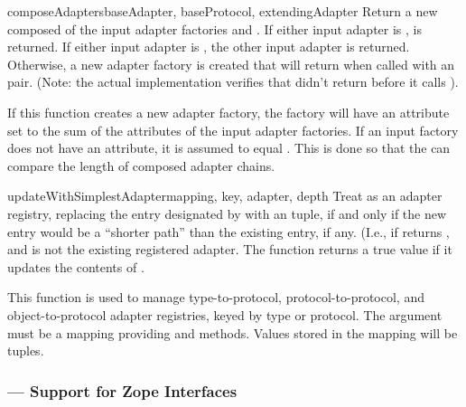 \begin{verbatim%
}
\begin{verbatim%
}
\begin{verbatim%
}
\begin{verbatim%
}
\begin{verbatim%
}
\begin{verbatim%
}
\begin{funcdesc}{composeAdapters}{baseAdapter, baseProtocol, extendingAdapter}
Return a new  composed of the input adapter factories
 and .  If either input adapter is
,  is returned.  If
either input adapter is , the other input adapter
is returned.  Otherwise, a new adapter factory is created that will return
when called with an  pair.  (Note: the actual
implementation verifies that  didn't return 
before it calls ).

If this function creates a new adapter factory, the factory will have an
 attribute set to the sum of the
 attributes of the input adapter factories.  If an
input factory does not have an  attribute, it is
assumed to equal .  This is done so that the
 can compare the length of composed adapter chains.
\end{funcdesc}


\begin{funcdesc}{updateWithSimplestAdapter}{mapping, key, adapter, depth}
Treat  as an adapter registry, replacing the entry designated by
 with an  tuple, if and only if
the new entry would be a ``shorter path'' than the existing entry, if any.
(I.e., if 
returns , and  is not the existing registered
adapter.  The function returns a true value if it updates the contents of
.

This function is used to manage type-to-protocol, protocol-to-protocol, and
object-to-protocol adapter registries, keyed by type or protocol.  The
 argument must be a mapping providing 
and  methods.  Values stored in the mapping will be
 tuples.
\end{funcdesc}





\newpage
\subsubsection{ --- Support for Zope Interfaces}


\end{verbatim%
}
\end{verbatim%
}
\end{verbatim%
}
\end{verbatim%
}
\end{verbatim%
}
\end{verbatim%
}
